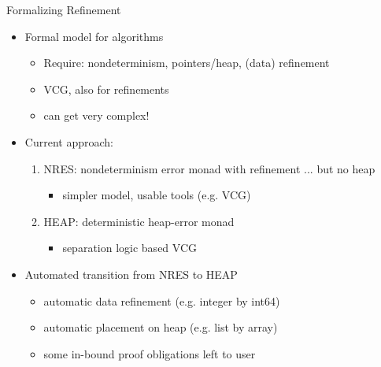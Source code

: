 \documentclass[fleqn]{beamer}
\begin{document}
\begin{frame}{Formalizing Refinement}
  \begin{itemize}
   \item<+-> Formal model for algorithms
    \begin{itemize}
     \item Require: nondeterminism, pointers/heap, (data) refinement
     \item VCG, also for refinements
     \item can get very complex!
    \end{itemize}
   \item<+-> Current approach:
    \begin{enumerate}
     \item NRES: nondeterminism error monad with refinement ... but no heap
      \begin{itemize}
       \item simpler model, usable tools (e.g. VCG)
      \end{itemize}
     \item HEAP: deterministic heap-error monad
      \begin{itemize}
       \item separation logic based VCG
      \end{itemize}
    \end{enumerate}
   \item<+-> Automated transition from NRES to HEAP
    \begin{itemize}
     \item automatic data refinement (e.g. integer by int64)
     \item automatic placement on heap (e.g. list by array)
     \item some in-bound proof obligations left to user



    \end{itemize}
  \end{itemize}
\end{frame}
\end{document}
